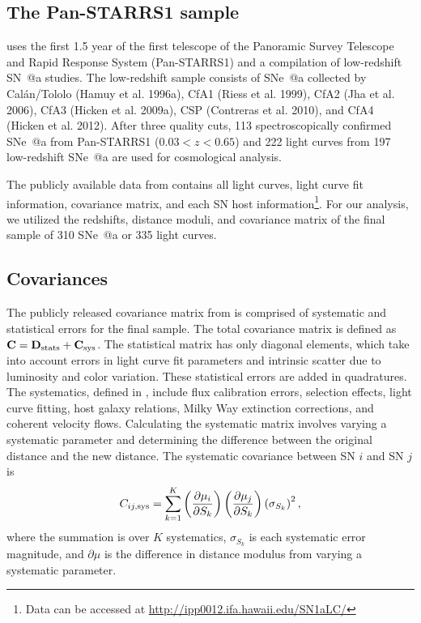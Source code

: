 \documentclass[12pt,a4paper]{article}
\makeatletter
\newcommand*{\rom}[1]{\expandafter\@slowromancap\romannumeral #1@}
\newcommand{\sn}{\mbox{SN}}
\newcommand{\sna}{\mbox{SN \rom{1}a}}
\newcommand{\snea}{\mbox{SNe \rom{1}a}}
\makeatother
\begin{document}
\subsection{The Pan-STARRS1 sample}
\label{sec:rest}
\citet{rest2014} uses the first 1.5 year of the first telescope of 
the Panoramic Survey Telescope and Rapid Response System (Pan-STARRS1) 
and a compilation of low-redshift {\sna} studies. The low-redshift 
sample consists of {\snea} collected by Cal\'{a}n/Tololo (Hamuy et al. 1996a), 
CfA1 (Riess et al. 1999), CfA2 (Jha et al. 2006), CfA3 (Hicken et al. 2009a), 
CSP (Contreras et al. 2010), and CfA4 (Hicken et al. 2012). After 
three quality cuts, 113 spectroscopically confirmed {\snea} from 
Pan-STARRS1 ($0.03 < z < 0.65$) and 222 light curves from 197 
low-redshift {\snea} are used for cosmological analysis. 

The publicly available data from \citet{rest2014} contains all light 
curves, light curve fit information, covariance matrix, and each {\sn} 
host information\footnote{Data can be accessed at 
\url{http://ipp0012.ifa.hawaii.edu/SN1aLC/}}. For our analysis, we 
utilized the redshifts, distance moduli, and covariance matrix of the 
final sample of 310 {\snea} or 335 light curves.

\subsection{Covariances}
\label{sec:covariances}
The publicly released covariance matrix from \citet{rest2014} 
is comprised of systematic and statistical errors for the final sample. 
The total covariance matrix is defined as 
$\mathbf{C}= \mathbf{D}_{\textnormal{stats}}+\mathbf{C}_{\textnormal{sys}}$. The 
statistical matrix has only diagonal elements, which take into account errors 
in light curve fit parameters and intrinsic scatter due to luminosity and 
color variation. These statistical errors are added in quadratures. The 
systematics, defined in \citet{scolnic2014}, include flux calibration errors, 
selection effects, light curve fitting, host galaxy relations, Milky Way 
extinction corrections, and coherent velocity flows. Calculating the systematic 
matrix involves varying a systematic parameter and determining the difference 
between the original distance and the new distance. The systematic covariance 
between {\sn} $i$ and {\sn} $j$ is 
%
\begin{equation}
  \label{eq:RestCovMatrix}
  C_{ij,\textnormal{sys}}=\displaystyle \sum_{k = 1}^K \left(\frac{\partial \mu_i}{\partial S_k}\right)\left(\frac{\partial \mu_j}{\partial S_k}\right)\left(\sigma_{S_k}\right)^2,
\end{equation}
%
where the summation is over $K$ systematics, $\sigma_{S_k}$ is each 
systematic error magnitude, and $\partial \mu$ is the difference in 
distance modulus from varying a systematic parameter.
\end{document}
